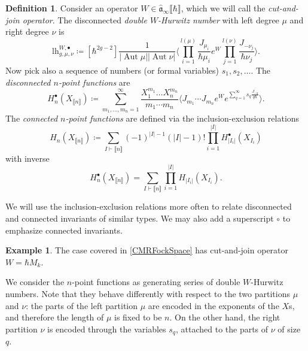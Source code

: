 \documentclass[10pt,a4paper,oneside,no-math,reqno]{amsart}%
\theoremstyle{plain}
\theoremstyle{definition}
\newtheorem{definition}[theorem]{Definition}
\newtheorem{example}[theorem]{Example}
\theoremstyle{remark}
\numberwithin{equation}{section}
\newcommand{\mf}[1]{\mathfrak{#1}}
\newcommand{\1}{\mathds{1}}
\newcommand{\<}{\langle}
\renewcommand{\>}{\rangle}
\DeclareMathOperator{\Aut}{Aut}
\newcommand{\lh}{\mathord{\mathrm{l\!h}}}
\begin{document}
\begin{definition}\label{DefHNfromCJ}
    Consider an operator $ W \in \widehat{\mf{a}}_\infty \llbracket \hbar \rrbracket $, which we will call the \emph{cut-and-join operator}. The disconnected \emph{double $W$-Hurwitz number} with left degree $ \mu$ and right degree $ \nu$ is
    \begin{equation}\label{DefLH}
        \lh^{W,\bullet}_{g,\mu,\nu}
        \coloneqq
        [\hbar^{2g-2} ]\frac{1}{| \Aut \mu| | \Aut \nu| } \Big\< \prod_{i = 1}^{l (\mu)} \frac{J_{\mu_i}}{\hbar \mu_i} e^W \prod_{j = 1}^{l(\nu)} \frac{J_{-\nu_j}}{\hbar \nu_j} \Big\> .
    \end{equation}
    Now pick also a sequence of numbers (or formal variables) $ s_1, s_2, \dotsc$. The \emph{disconnected $n$-point functions} are
    \begin{equation}
        H_{n}^\bullet (X_{\llbracket n\rrbracket})
        \coloneqq
        \sum_{m_1, \dotsc, m_n = 1}^\infty \frac{X_1^{m_1} \dotsc X_n^{m_n}}{m_1 \dotsb m_n} \Big\< J_{m_1} \dotsb J_{m_n} e^W e^{\sum_{q=1}^\infty s_q \frac{J_{-q}}{q\hbar}} \Big\>.
    \end{equation}
    The \emph{connected $n$-point functions} are defined via the inclusion-exclusion relations
    \begin{equation}
        H_n (X_{\llbracket n \rrbracket})
        \coloneqq
        \sum_{I \vdash \llbracket n \rrbracket} (-1)^{|I|-1} (|I|-1)! \prod_{i=1}^{|I|} H_{|I_i|}^\bullet (X_{I_i})
    \end{equation}
    with inverse
    \begin{equation}
        H_n^\bullet (X_{\llbracket n \rrbracket})
        =
        \sum_{I \vdash \llbracket n \rrbracket} \prod_{i =1}^{|I|} H_{|I_i|} (X_{I_i}) .
    \end{equation}
\end{definition}

We will use the inclusion-exclusion relations more often to relate disconnected and connected invariants of similar types. We may also add a superscript $ \circ$ to emphasize connected invariants.

\begin{example}
    The case covered in \cref{CMRFockSpace} has cut-and-join operator $ W = \hbar M_k$.
\end{example}

We consider the $n$-point functions as generating series of double $W$-Hurwitz numbers. Note that they behave differently with respect to the two partitions $ \mu$ and $\nu$: the parts of the left partition $ \mu$ are encoded in the exponents of the $ X$s, and therefore the length of $ \mu $ is fixed to be $n$. On the other hand, the right partition $ \nu$ is encoded through the variables $ s_q$, attached to the parts of $\nu$ of size $ q$.
\end{document}
